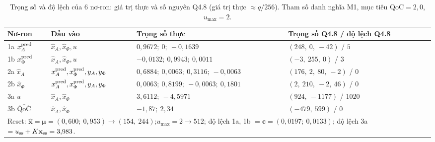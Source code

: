 \documentclass[11pt,a4paper]{article}
\newcommand{\QoC}{\mathrm{QoC}}
\newcommand{\xh}{\hat{\mathbf x}}
\begin{document}
\begin{table}[H]
\centering\small
\caption{Trọng số và độ lệch của 6 nơ-ron: giá trị thực và số nguyên Q4.8 (giá trị thực $\approx q/256$).
Tham số danh nghĩa M1, mục tiêu $\QoC=2{,}0$, $u_{\max}=2$.}
\label{tab:weights}
\begin{tabular}{llll}
\toprule
Nơ-ron & Đầu vào & Trọng số thực & Trọng số Q4.8 / độ lệch Q4.8 \\
\midrule
1a $x^{\rm pred}_A$    & $\hat x_A,\hat x_\Phi,u$          & $0{,}9672;\ 0;\ -0{,}1639$              & $(248,\ 0,\ -42)$ / $5$ \\
1b $x^{\rm pred}_\Phi$ & $\hat x_A,\hat x_\Phi,u$          & $-0{,}0132;\ 0{,}9943;\ 0{,}0011$       & $(-3,\ 255,\ 0)$ / $3$ \\
2a $\hat x_A$          & $x^{\rm pred}_A,x^{\rm pred}_\Phi,y_A,y_\Phi$ & $0{,}6884;\ 0{,}0063;\ 0{,}3116;\ -0{,}0063$ & $(176,\ 2,\ 80,\ -2)$ / $0$ \\
2b $\hat x_\Phi$       & $x^{\rm pred}_A,x^{\rm pred}_\Phi,y_A,y_\Phi$ & $0{,}0063;\ 0{,}8199;\ -0{,}0063;\ 0{,}1801$ & $(2,\ 210,\ -2,\ 46)$ / $0$ \\
3a $u$                 & $\hat x_A,\hat x_\Phi$            & $3{,}6112;\ -4{,}5971$                  & $(924,\ -1177)$ / $1020$ \\
3b $\widehat{\QoC}$    & $\hat x_A,\hat x_\Phi$            & $-1{,}87;\ 2{,}34$                      & $(-479,\ 599)$ / $0$ \\
\midrule
\multicolumn{4}{p{0.95\linewidth}}{Reset: $\xh=\boldsymbol\mu=(0{,}600;\ 0{,}953)\to(154,\ 244)$;\quad $u_{\max}=2\to512$;\quad
độ lệch 1a, 1b $=\mathbf c=(0{,}0197;\ 0{,}0133)$; độ lệch 3a $=u_{\rm ss}+K\mathbf x_{\rm ss}=3{,}983$.}\\
\bottomrule
\end{tabular}
\end{table}
\end{document}
